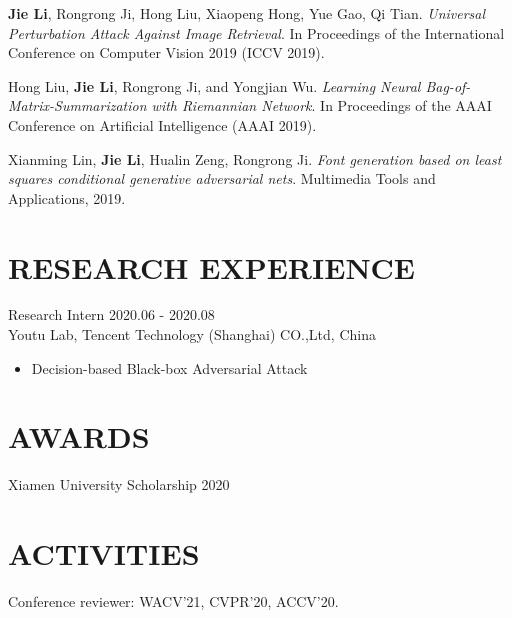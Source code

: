 \documentclass[margin, 10pt]{res} %
\begin{document}
\begin{resume}
\textbf{Jie Li}, Rongrong Ji, Hong Liu, Xiaopeng Hong, Yue Gao, Qi Tian. \textit{Universal Perturbation Attack Against Image Retrieval}.
In Proceedings of the International Conference on Computer Vision 2019 (ICCV 2019).

Hong Liu, \textbf{Jie Li}, Rongrong Ji, and Yongjian Wu. \textit{Learning Neural Bag-of-Matrix-Summarization with Riemannian Network}.
In Proceedings of the AAAI Conference on Artificial Intelligence (AAAI 2019).

Xianming Lin, \textbf{Jie Li}, Hualin Zeng, Rongrong Ji. \textit{Font generation based on least squares conditional generative adversarial nets}.
Multimedia Tools and Applications, 2019.

\section{RESEARCH EXPERIENCE}
Research Intern \hfill 2020.06 - 2020.08 \\
Youtu Lab, Tencent Technology (Shanghai) CO.,Ltd, China
\begin{itemize}
    \item Decision-based Black-box Adversarial Attack
\end{itemize}

\section{AWARDS}
Xiamen University Scholarship \hfill 2020

\section{ACTIVITIES}
Conference reviewer: WACV'21, CVPR'20, ACCV'20.

\end{resume}
\end{document}
